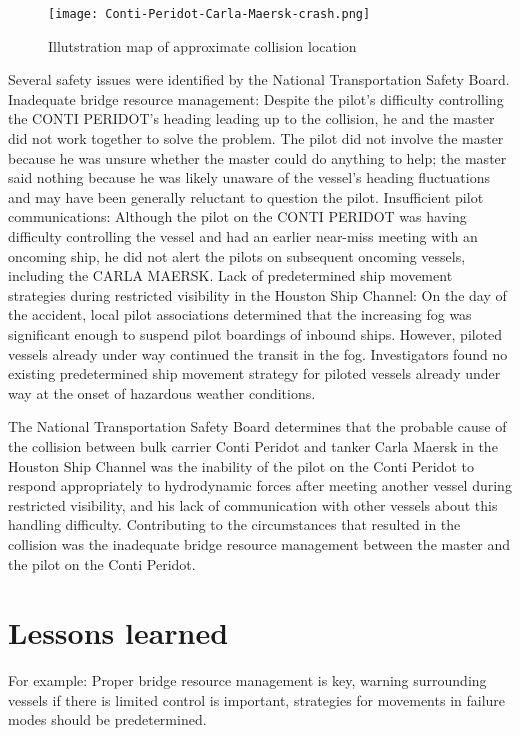 \begin{wrapfigure}{L}{0.6\textwidth}
	\centering
	\texttt{[image: Conti-Peridot-Carla-Maersk-crash.png]}
	\caption{Illutstration map of approximate collision location}
	\label{fig:Conti-Peridot-Carla-Maersk-crash}
\end{wrapfigure}

Several safety issues were identified by the National Transportation Safety Board. Inadequate bridge resource management: Despite the pilot’s difficulty controlling the CONTI PERIDOT’s heading leading up to the collision, he and the master did not work together to solve the problem. The pilot did not involve the master because he was unsure whether the master could do anything to help; the master said nothing because he was likely unaware of the vessel’s heading fluctuations and may have been generally reluctant to question the pilot.
Insufficient pilot communications: Although the pilot on the CONTI PERIDOT was having difficulty controlling the vessel and had an earlier near-miss meeting with an oncoming ship, he did not alert the pilots on subsequent oncoming vessels, including the CARLA MAERSK.
Lack of predetermined ship movement strategies during restricted visibility in the Houston Ship Channel: On the day of the accident, local pilot associations  determined that the increasing fog was significant enough to suspend pilot boardings of inbound ships. However, piloted vessels already under way continued the transit in the fog. Investigators found no existing predetermined ship movement strategy for piloted vessels already under way at the onset of hazardous weather conditions.

The National Transportation Safety Board determines that the probable cause of the collision between bulk carrier Conti Peridot and tanker Carla Maersk in the Houston Ship Channel was the inability of the pilot on the Conti Peridot to respond appropriately to hydrodynamic forces after meeting another vessel during restricted visibility, and his lack of communication with other vessels about this handling difficulty. Contributing to the circumstances that resulted in the collision was the inadequate bridge resource management between the master and the pilot on the Conti Peridot. \cite{NTSB2016}\cite{NTSB2016a}

\section{Lessons learned}
For example: Proper bridge resource management is key, warning surrounding vessels if there is limited control is important, strategies for movements in failure modes should be predetermined.


